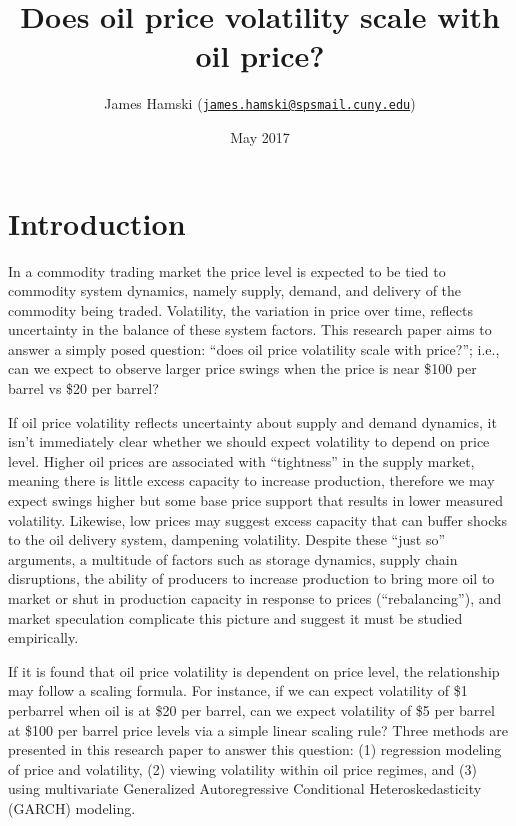 \documentclass[]{article}
\title{Does oil price volatility scale with oil price?}
\author{James Hamski
(\href{mailto:james.hamski@spsmail.cuny.edu}{\nolinkurl{james.hamski@spsmail.cuny.edu}})}
\date{May 2017}
\begin{document}
\maketitle

\section{Introduction}\label{introduction}

In a commodity trading market the price level is expected to be tied to
commodity system dynamics, namely supply, demand, and delivery of the
commodity being traded. Volatility, the variation in price over time,
reflects uncertainty in the balance of these system factors. This
research paper aims to answer a simply posed question: ``does oil price
volatility scale with price?''; i.e., can we expect to observe larger
price swings when the price is near \$100 per barrel vs \$20 per barrel?

If oil price volatility reflects uncertainty about supply and demand
dynamics, it isn't immediately clear whether we should expect volatility
to depend on price level. Higher oil prices are associated with
``tightness'' in the supply market, meaning there is little excess
capacity to increase production, therefore we may expect swings higher
but some base price support that results in lower measured volatility.
Likewise, low prices may suggest excess capacity that can buffer shocks
to the oil delivery system, dampening volatility. Despite these ``just
so'' arguments, a multitude of factors such as storage dynamics, supply
chain disruptions, the ability of producers to increase production to
bring more oil to market or shut in production capacity in response to
prices (``rebalancing''), and market speculation complicate this picture
and suggest it must be studied empirically.

If it is found that oil price volatility is dependent on price level,
the relationship may follow a scaling formula. For instance, if we can
expect volatility of \$1 perbarrel when oil is at \$20 per barrel, can
we expect volatility of \$5 per barrel at \$100 per barrel price levels
via a simple linear scaling rule? Three methods are presented in this
research paper to answer this question: (1) regression modeling of price
and volatility, (2) viewing volatility within oil price regimes, and (3)
using multivariate Generalized Autoregressive Conditional
Heteroskedasticity (GARCH) modeling.
\end{document}
